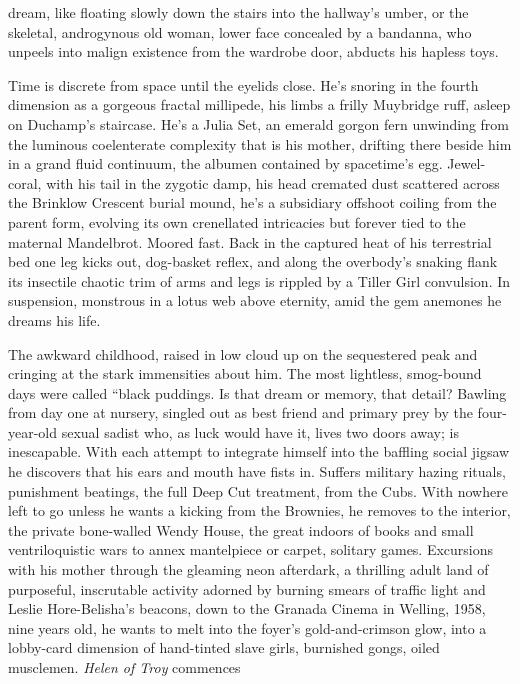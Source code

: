 \documentclass[
]{article}
\begin{document}
dream, like floating slowly down the stairs into the hallway's umber, or
the skeletal, androgynous old woman, lower face concealed by a bandanna,
who unpeels into malign existence from the wardrobe door, abducts his
hapless toys. \par
Time is discrete from space until the eyelids close. He's snoring
in the fourth dimension as a gorgeous fractal millipede, his limbs a
frilly Muybridge ruff, asleep on Duchamp's staircase. He's a Julia Set,
an emerald gorgon fern unwinding from the luminous coelenterate
complexity that is his mother, drifting there beside him in a grand
fluid continuum, the albumen contained by spacetime's egg. Jewel-coral,
with his tail in the zygotic damp, his head cremated dust scattered
across the Brinklow Crescent burial mound, he's a subsidiary offshoot
coiling from the parent form, evolving its own crenellated intricacies
but forever tied to the maternal Mandelbrot. Moored fast. Back in the
captured heat of his terrestrial bed one leg kicks out, dog-basket
reflex, and along the overbody's snaking flank its insectile chaotic
trim of arms and legs is rippled by a Tiller Girl convulsion. In
suspension, monstrous in a lotus web above eternity, amid the gem
anemones he dreams his life. \par
The awkward childhood, raised in low cloud up on the sequestered
peak and cringing at the stark immensities about him. The most
lightless, smog-bound days were called ``black puddings. Is that dream
or memory, that detail? Bawling from day one at nursery, singled out as
best friend and primary prey by the four-year-old sexual sadist who, as
luck would have it, lives two doors away; is inescapable. With each
attempt to integrate himself into the baffling social jigsaw he
discovers that his ears and mouth have fists in. Suffers military hazing
rituals, punishment beatings, the full Deep Cut treatment, from the
Cubs. With nowhere left to go unless he wants a kicking from the
Brownies, he removes to the interior, the private bone-walled Wendy
House, the great indoors of books and small ventriloquistic wars to
annex mantelpiece or carpet, solitary games. Excursions with his mother
through the gleaming neon afterdark, a thrilling adult land of
purposeful, inscrutable activity adorned by burning smears of traffic
light and Leslie Hore-Belisha's beacons, down to the Granada Cinema in
Welling, 1958, nine years old, he wants to melt into the foyer's
gold-and-crimson glow, into a lobby-card dimension of hand-tinted slave
girls, burnished gongs, oiled musclemen. \emph{Helen of Troy} commences
\end{document}
